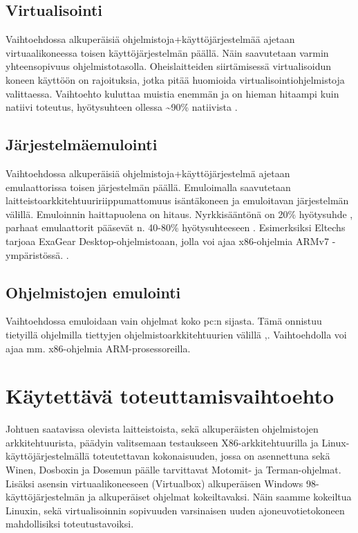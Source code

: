\documentclass[11pt,a4paper,oneside,article]{memoir}
\begin{document}
\subsection{Virtualisointi}

Vaihtoehdossa alkuperäisiä ohjelmistoja+käyttöjärjestelmää ajetaan virtuaalikoneessa toisen käyttöjärjestelmän päällä. Näin saavutetaan varmin yhteensopivuus ohjelmistotasolla. Oheislaitteiden siirtämisessä virtualisoidun koneen käyttöön on rajoituksia, jotka pitää huomioida virtualisointiohjelmistoja valittaessa. Vaihtoehto kuluttaa muistia enemmän ja on hieman hitaampi kuin natiivi toteutus, hyötysuhteen ollessa \textasciitilde{}90\%  natiivista \cite{virtnat_anadtech}. 

\subsection{Järjestelmäemulointi}

Vaihtoehdossa alkuperäisiä ohjelmistoja+käyttöjärjestelmä ajetaan emulaattorissa toisen järjestelmän päällä. Emuloimalla saavutetaan laitteistoarkkitehtuuririippumattomuus isäntäkoneen ja emuloitavan järjestelmän välillä. Emuloinnin haittapuolena on hitaus. Nyrkkisääntönä on 20\% hyötysuhde \cite{tinycc}, parhaat emulaattorit pääsevät n. 40-80\% hyötysuhteeseen \cite{40pperf}. Esimerksiksi Eltechs tarjoaa ExaGear Desktop-ohjelmistoaan, jolla voi ajaa x86-ohjelmia ARMv7 -ympäristössä. \cite{eltechs:exagear}. 

\subsection{Ohjelmistojen emulointi}

Vaihtoehdossa emuloidaan vain ohjelmat koko pc:n sijasta. Tämä onnistuu tietyillä ohjelmilla tiettyjen ohjelmistoarkkitehtuurien välillä \cite{tinycc},\cite{qemu_use}. Vaihtoehdolla voi ajaa mm. x86-ohjelmia ARM-prosessoreilla.

\section{Käytettävä toteuttamisvaihtoehto}

Johtuen saatavissa olevista laitteistoista, sekä alkuperäisten ohjelmistojen arkkitehtuurista, päädyin valitsemaan testaukseen X86-arkkitehtuurilla ja Linux-käyttöjärjestelmällä toteutettavan kokonaisuuden, jossa on asennettuna sekä Winen, Dosboxin ja Dosemun päälle tarvittavat Motomit- ja Terman-ohjelmat. Lisäksi asensin virtuaalikoneeseen (Virtualbox) alkuperäisen Windows 98-käyttöjärjestelmän ja alkuperäiset ohjelmat kokeiltavaksi. Näin saamme kokeiltua Linuxin, sekä virtualisoinnin sopivuuden varsinaisen uuden ajoneuvotietokoneen mahdollisiksi toteutustavoiksi.
\end{document}
